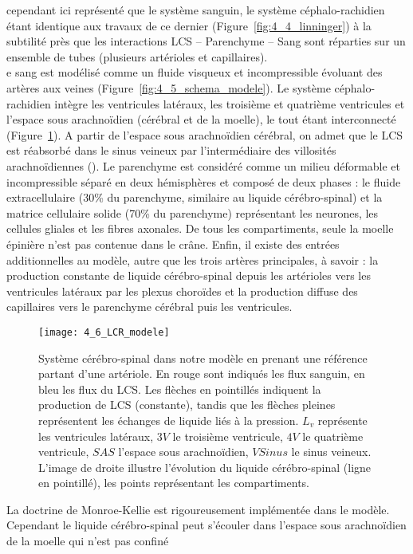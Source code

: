 cependant ici représenté que le système sanguin, le système céphalo-rachidien étant identique aux
travaux de ce dernier (Figure~\ref{fig:4_4_linninger}) à la subtilité près que les interactions LCS – Parenchyme – Sang sont
réparties sur un ensemble de tubes (plusieurs artérioles et capillaires).\\
e sang est modélisé comme un fluide visqueux et incompressible évoluant des artères aux veines
(Figure~\ref{fig:4_5_schema_modele}). Le système céphalo-rachidien intègre les ventricules latéraux, les troisième et quatrième
ventricules et l’espace sous arachnoïdien (cérébral et de la moelle), le tout étant interconnecté (Figure~\ref{fig:4_6_LCR_modele}). A partir de l’espace sous arachnoïdien cérébral, on admet que le LCS est réabsorbé dans le sinus
veineux par l’intermédiaire des villosités arachnoïdiennes (\cite{Segal2001}). Le parenchyme est considéré comme
un milieu déformable et incompressible séparé en deux hémisphères et composé de deux phases : le
fluide extracellulaire (30\% du parenchyme, similaire au liquide cérébro-spinal) et la matrice cellulaire
solide (70\% du parenchyme) représentant les neurones, les cellules gliales et les fibres axonales. De
tous les compartiments, seule la moelle épinière n’est pas contenue dans le crâne. Enfin, il existe des
entrées additionnelles au modèle, autre que les trois artères principales, à savoir : la production constante de liquide cérébro-spinal depuis les artérioles vers les ventricules latéraux par les plexus
choroïdes et la production diffuse des capillaires vers le parenchyme cérébral puis les ventricules.\\
\begin{figure}[!t]
\centering
\texttt{[image: 4\_6\_LCR\_modele]}
\caption{Système cérébro-spinal dans notre modèle en prenant une référence partant d’une artériole. En rouge sont
indiqués les flux sanguin, en bleu les flux du LCS. Les flèches en pointillés indiquent la production de LCS (constante), tandis
que les flèches pleines représentent les échanges de liquide liés à la pression. $L_v$ représente les ventricules latéraux, $3V$ le
troisième ventricule, $4V$ le quatrième ventricule, $SAS$ l’espace sous arachnoïdien, $VSinus$ le sinus veineux. L’image de droite
illustre l’évolution du liquide cérébro-spinal (ligne en pointillé), les points représentant les compartiments.}
\label{fig:4_6_LCR_modele}	
\end{figure}
La doctrine de Monroe-Kellie est rigoureusement implémentée dans le modèle. Cependant le
liquide cérébro-spinal peut s’écouler dans l’espace sous arachnoïdien de la moelle qui n’est pas confiné
